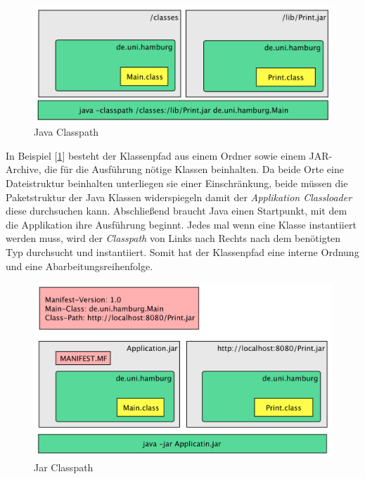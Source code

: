 \begin{figure}[h]
  \includegraphics[width=\textwidth]{material/images/Classpath.png}
  \caption{Java Classpath}
  \label{fig:Classpath-Simple}
\end{figure}

 In Beispiel [\ref{fig:Classpath-Simple}] besteht der Klassenpfad aus einem Ordner sowie einem JAR-Archive, die für die Ausführung nötige Klassen beinhalten. Da beide Orte eine Dateistruktur beinhalten unterliegen sie einer Einschränkung, beide müssen die Paketstruktur der Java Klassen widerspiegeln damit der \textit{Applikation Classloader} diese durchsuchen kann. Abschließend braucht Java einen Startpunkt, mit dem die Applikation ihre Ausführung beginnt. Jedes mal wenn eine Klasse instantiiert werden muss, wird der \textit{Classpath} von Links nach Rechts nach dem benötigten Typ durchsucht und instantiiert. Somit hat der Klassenpfad eine interne Ordnung und eine Abarbeitungsreihenfolge.
\begin{figure}[h]
  \includegraphics[width=\textwidth]{material/images/Classpath-Manifest.png}
  \caption{Jar Classpath}
  \label{fig:Classpath-Advanced}
\end{figure}

